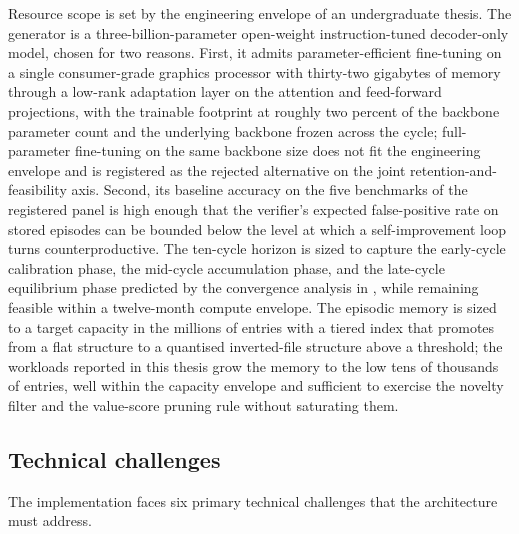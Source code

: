 Resource scope is set by the engineering envelope of an undergraduate thesis. The generator is a three-billion-parameter open-weight instruction-tuned decoder-only model, chosen for two reasons. First, it admits parameter-efficient fine-tuning on a single consumer-grade graphics processor with thirty-two gigabytes of memory through a low-rank adaptation layer on the attention and feed-forward projections, with the trainable footprint at roughly two percent of the backbone parameter count and the underlying backbone frozen across the cycle; full-parameter fine-tuning on the same backbone size does not fit the engineering envelope and is registered as the rejected alternative on the joint retention-and-feasibility axis. Second, its baseline accuracy on the five benchmarks of the registered panel is high enough that the verifier's expected false-positive rate on stored episodes can be bounded below the level at which a self-improvement loop turns counterproductive. The ten-cycle horizon is sized to capture the early-cycle calibration phase, the mid-cycle accumulation phase, and the late-cycle equilibrium phase predicted by the convergence analysis in , while remaining feasible within a twelve-month compute envelope. The episodic memory is sized to a target capacity in the millions of entries with a tiered index that promotes from a flat structure to a quantised inverted-file structure above a threshold; the workloads reported in this thesis grow the memory to the low tens of thousands of entries, well within the capacity envelope and sufficient to exercise the novelty filter and the value-score pruning rule without saturating them.

\subsection{Technical challenges}
\label{sec:scope-challenges}

The implementation faces six primary technical challenges that the architecture must address.

